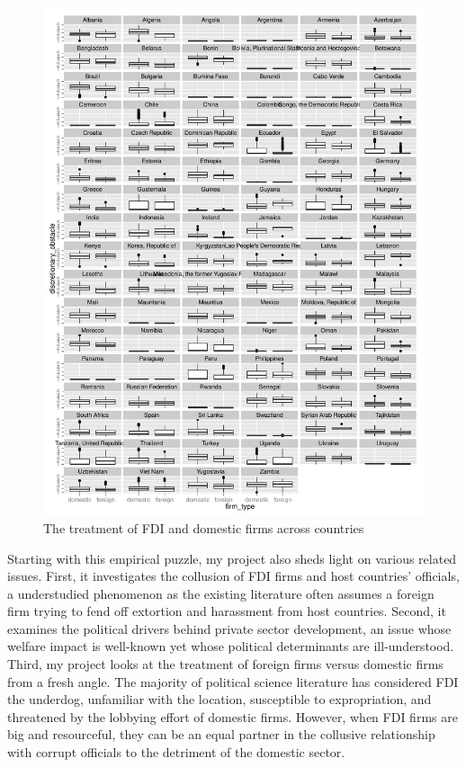 \documentclass[12pt]{article}
\begin{document}
\begin{figure}[!ht]
\includegraphics[width=\textwidth, height=\textheight,keepaspectratio]{../figure/fdi_domestic_treatment}
\caption{The treatment of FDI and domestic firms across countries}
\label{fig:fdi_domestic_treatment}
\end{figure}

Starting with this empirical puzzle, my project also sheds light on various related issues. First, it investigates the collusion of FDI firms and host countries' officials, a understudied phenomenon as the existing literature often assumes a foreign firm trying to fend off extortion and harassment from host countries. Second, it examines the political drivers behind private sector development, an issue whose welfare impact is well-known yet whose political determinants are ill-understood. Third, my project looks at the treatment of foreign firms versus domestic firms from a fresh angle. The majority of political science literature has considered FDI the underdog, unfamiliar with the location, susceptible to expropriation, and threatened by the lobbying effort of domestic firms. However, when FDI firms are big and resourceful, they can be an equal partner in the collusive relationship with corrupt officials to the detriment of the domestic sector.
\end{document}
